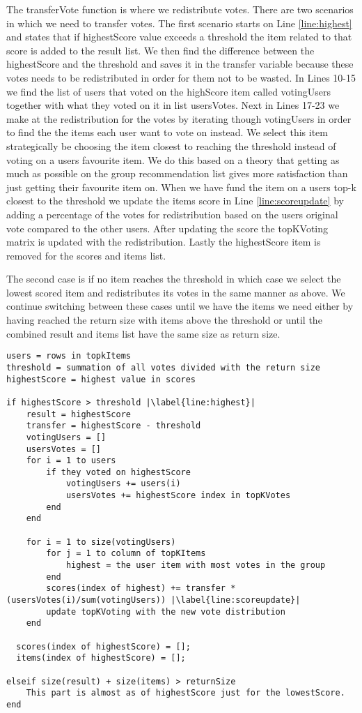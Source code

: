 The transferVote function is where we redistribute votes. There are two scenarios in which we need to transfer votes. The first scenario starts on Line \ref{line:highest} and states that if highestScore value exceeds a threshold the item related to that score is added to the result list. We then find the difference between the highestScore and the threshold and saves it in the transfer variable because these votes needs to be redistributed in order for them not to be wasted. In Lines 10-15 we find the list of users that voted on the highScore item  called votingUsers together with what they voted on it in list usersVotes. Next in Lines 17-23 we make at the redistribution for the votes by iterating though votingUsers in order to find the the items each user want to vote on instead. We select this item strategically be choosing the item closest to reaching the threshold instead of voting on a users favourite item. We do this based on a theory that getting as much as possible on the group recommendation list gives more satisfaction than just getting their favourite item on. When we have fund the item on a users top-k closest to the threshold we update the items score in Line \ref{line:scoreupdate} by adding a percentage of the votes for redistribution based on the users original vote compared to the other users.  After updating the score the topKVoting matrix is updated with the redistribution. Lastly the highestScore item is removed for the scores and items list. 

The second case is if no item reaches the threshold in which case we select the lowest scored item and redistributes its votes in the same manner as above. We continue switching between these cases until we have the items we need either by having reached the return size with items above the threshold or until the combined result and items list have the same size as return size.

\begin{lstlisting}[caption={Implementation for the transfer method},label=lst:BTCtransfer]
users = rows in topkItems
threshold = summation of all votes divided with the return size
highestScore = highest value in scores

if highestScore > threshold |\label{line:highest}|
	result = highestScore
	transfer = highestScore - threshold
	votingUsers = []
	usersVotes = []
	for i = 1 to users 
		if they voted on highestScore
			votingUsers += users(i)
			usersVotes += highestScore index in topKVotes
		end
	end
		
	for i = 1 to size(votingUsers)
		for j = 1 to column of topKItems
			highest = the user item with most votes in the group
		end
		scores(index of highest) += transfer * (usersVotes(i)/sum(votingUsers)) |\label{line:scoreupdate}|
		update topKVoting with the new vote distribution 
	end
	
  scores(index of highestScore) = [];
  items(index of highestScore) = [];
	
elseif size(result) + size(items) > returnSize
	This part is almost as of highestScore just for the lowestScore.
end

\end{lstlisting}